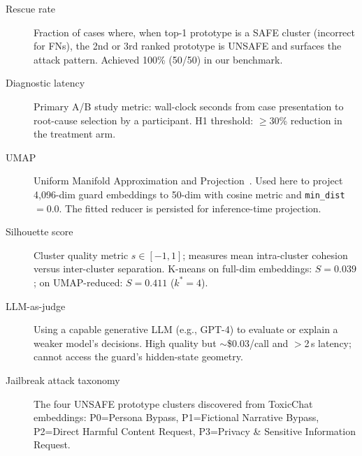 \begin{description}
\item[Rescue rate]
Fraction of cases where, when top-1 prototype is a SAFE cluster (incorrect for FNs),
the 2nd or 3rd ranked prototype is UNSAFE and surfaces the attack pattern.
Achieved 100\% (50/50) in our benchmark.

\item[Diagnostic latency]
Primary A/B study metric: wall-clock seconds from case presentation to root-cause
selection by a participant. H1 threshold: $\geq$30\% reduction in the treatment arm.

\item[UMAP]
Uniform Manifold Approximation and Projection~\cite{mcinnes2018umap}. Used here
to project 4,096-dim guard embeddings to 50-dim with cosine metric and
\texttt{min\_dist}$=$0.0. The fitted reducer is persisted for inference-time projection.

\item[Silhouette score]
Cluster quality metric $s \in [-1, 1]$; measures mean intra-cluster cohesion versus
inter-cluster separation. K-means on full-dim embeddings: $S=0.039$; on UMAP-reduced:
$S=0.411$ ($k^*=4$).

\item[LLM-as-judge]
Using a capable generative LLM (e.g., GPT-4) to evaluate or explain a weaker
model's decisions. High quality but $\sim$\$0.03/call and $>$2\,s latency;
cannot access the guard's hidden-state geometry.

\item[Jailbreak attack taxonomy]
The four UNSAFE prototype clusters discovered from ToxicChat embeddings:
P0=Persona Bypass, P1=Fictional Narrative Bypass, P2=Direct Harmful Content Request,
P3=Privacy \& Sensitive Information Request.

\end{description}
